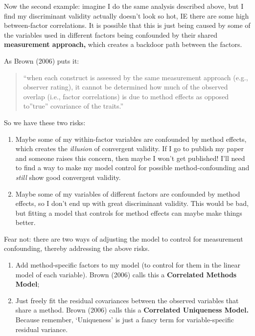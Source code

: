 \documentclass[
  letterpaper,
  DIV=11,
  numbers=noendperiod]{scrreprt}
\providecommand{\tightlist}{%
  \setlength{\itemsep}{0pt}\setlength{\parskip}{0pt}}\usepackage{longtable,booktabs,array}
\begin{document}
Now the second example: imagine I do the same analysis described above,
but I find my discriminant validity actually doesn't look so hot, IE
there are some high between-factor correlations. It is possible that
this is just being caused by some of the variables used in different
factors being confounded by their shared \textbf{measurement approach,}
which creates a backdoor path between the factors.

As Brown (2006) puts it:

\begin{quote}
``when each construct is assessed by the same measurement approach
(e.g., observer rating), it cannot be determined how much of the
observed overlap (i.e., factor correlations) is due to method effects as
opposed to''true'' covariance of the traits.''
\end{quote}

So we have these two risks:

\begin{enumerate}
\def\labelenumi{\arabic{enumi}.}
\tightlist
\item
  Maybe some of my within-factor variables are confounded by method
  effects, which creates the \emph{illusion} of convergent validity. If
  I go to publish my paper and someone raises this concern, then maybe I
  won't get published! I'll need to find a way to make my model control
  for possible method-confounding and \emph{still} show good convergent
  validity.
\item
  Maybe some of my variables of different factors are confounded by
  method effects, so I don't end up with great discriminant validity.
  This would be bad, but fitting a model that controls for method
  effects can maybe make things better.
\end{enumerate}

Fear not: there are two ways of adjusting the model to control for
measurement confounding, thereby addressing the above risks.

\begin{enumerate}
\def\labelenumi{\arabic{enumi}.}
\item
  Add method-specific factors to my model (to control for them in the
  linear model of each variable). Brown (2006) calls this a
  \textbf{Correlated Methods Model};
\item
  Just freely fit the residual covariances between the observed
  variables that share a method. Brown (2006) calls this a
  \textbf{Correlated Uniqueness Model.} Because remember, `Uniqueness'
  is just a fancy term for variable-specific residual variance.
\end{enumerate}
\end{document}
